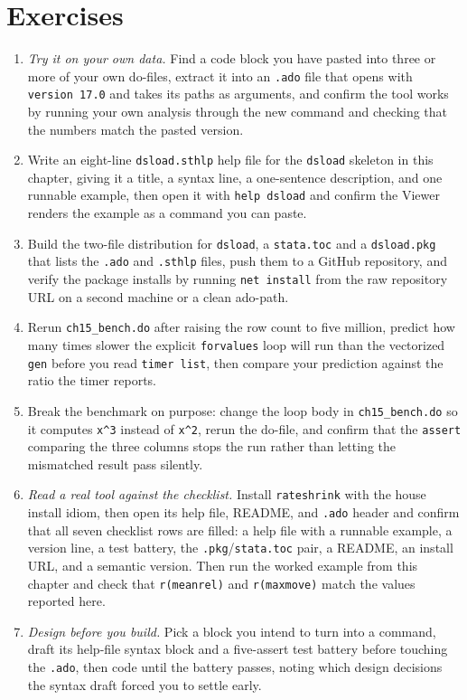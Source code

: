 \section*{Exercises}
\begin{enumerate}
    \item \emph{Try it on your own data.} Find a code block you have pasted into three or more of your own do-files, extract it into an \texttt{.ado} file that opens with \texttt{version 17.0} and takes its paths as arguments, and confirm the tool works by running your own analysis through the new command and checking that the numbers match the pasted version.
    \item Write an eight-line \texttt{dsload.sthlp} help file for the \texttt{dsload} skeleton in this chapter, giving it a title, a syntax line, a one-sentence description, and one runnable example, then open it with \texttt{help dsload} and confirm the Viewer renders the example as a command you can paste.
    \item Build the two-file distribution for \texttt{dsload}, a \texttt{stata.toc} and a \texttt{dsload.pkg} that lists the \texttt{.ado} and \texttt{.sthlp} files, push them to a GitHub repository, and verify the package installs by running \texttt{net install} from the raw repository URL on a second machine or a clean ado-path.
    \item Rerun \texttt{ch15\_bench.do} after raising the row count to five million, predict how many times slower the explicit \texttt{forvalues} loop will run than the vectorized \texttt{gen} before you read \texttt{timer list}, then compare your prediction against the ratio the timer reports.
    \item Break the benchmark on purpose: change the loop body in \texttt{ch15\_bench.do} so it computes \texttt{x\textasciicircum 3} instead of \texttt{x\textasciicircum 2}, rerun the do-file, and confirm that the \texttt{assert} comparing the three columns stops the run rather than letting the mismatched result pass silently.
    \item \emph{Read a real tool against the checklist.} Install \texttt{rateshrink} with the house install idiom, then open its help file, README, and \texttt{.ado} header and confirm that all seven checklist rows are filled: a help file with a runnable example, a version line, a test battery, the \texttt{.pkg}/\texttt{stata.toc} pair, a README, an install URL, and a semantic version. Then run the worked example from this chapter and check that \texttt{r(meanrel)} and \texttt{r(maxmove)} match the values reported here.
    \item \emph{Design before you build.} Pick a block you intend to turn into a command, draft its help-file syntax block and a five-assert test battery before touching the \texttt{.ado}, then code until the battery passes, noting which design decisions the syntax draft forced you to settle early.
\end{enumerate}
